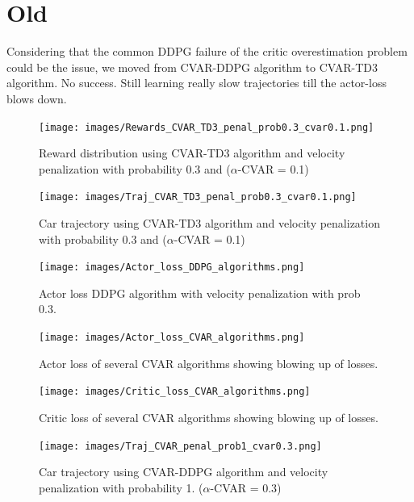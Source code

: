 \section{Old}
Considering that the common DDPG failure of the critic overestimation problem could be the issue, we moved from CVAR-DDPG algorithm to CVAR-TD3 algorithm.
No success. Still learning really slow trajectories till the actor-loss blows down.


\begin{figure}[t]
        \centering
        \texttt{[image: images/Rewards\_CVAR\_TD3\_penal\_prob0.3\_cvar0.1.png]}
        \caption{Reward distribution using CVAR-TD3 algorithm and velocity penalization with probability 0.3 and ($\alpha$-CVAR = 0.1)}
        \label{rew_cvar_td3_probpenal0.3_cvar0.1}
    
\end{figure}

\begin{figure}[t]
        \centering
        \texttt{[image: images/Traj\_CVAR\_TD3\_penal\_prob0.3\_cvar0.1.png]}
        \caption{Car trajectory using CVAR-TD3 algorithm and velocity penalization with probability 0.3 and ($\alpha$-CVAR = 0.1)}
        \label{traj_cvar_td3_probpenal0.3_cvar0.1}
    
\end{figure}

\begin{figure}[t]
    \begin{minipage}[t]{.5\textwidth}
        \centering
        \texttt{[image: images/Actor\_loss\_DDPG\_algorithms.png]}
        \caption{Actor loss DDPG algorithm with velocity penalization with prob 0.3.}
        \label{ddpg_actor_loss}
    \end{minipage}%
    \hfill%
    \begin{minipage}[t]{.5\textwidth}
        \centering
        \texttt{[image: images/Actor\_loss\_CVAR\_algorithms.png]}
        \caption{Actor loss of several CVAR algorithms showing blowing up of losses.}
        \label{cvar_actor_loss}
    \end{minipage}
\end{figure}


\begin{figure}[t]
        \centering
        \texttt{[image: images/Critic\_loss\_CVAR\_algorithms.png]}
        \caption{Critic loss of several CVAR algorithms showing blowing up of losses.}
        \label{cvar_critic_loss}
    
\end{figure}
\begin{figure}[t]
        \centering
        \texttt{[image: images/Traj\_CVAR\_penal\_prob1\_cvar0.3.png]}
        \caption{Car trajectory using CVAR-DDPG algorithm and velocity penalization with probability 1. ($\alpha$-CVAR = 0.3)}
        \label{traj_cvarddpg_probpenal1_cvar0.3}
    
\end{figure}